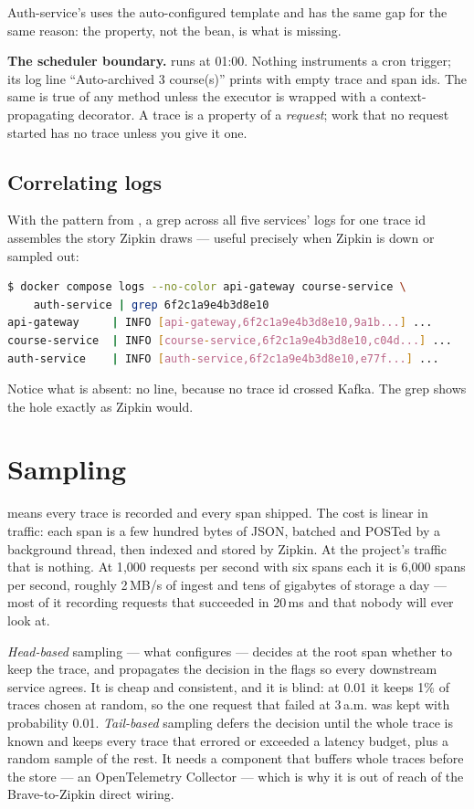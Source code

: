 Auth-service's  uses the auto-configured
template and has the same gap for the same reason: the property, not
the bean, is what is missing.

\textbf{The scheduler boundary.}  runs
 at 01:00. Nothing instruments a cron trigger; its log
line ``Auto-archived 3 course(s)'' prints with empty trace and span ids.
The same is true of any  method unless the executor is
wrapped with a context-propagating decorator. A trace is a property of a
\emph{request}; work that no request started has no trace unless you
give it one.

\subsection{Correlating logs}

With the pattern from , a grep across all five services' logs for
one trace id assembles the story Zipkin draws --- useful precisely when
Zipkin is down or sampled out:

\begin{lstlisting}[language=bash]
$ docker compose logs --no-color api-gateway course-service \
    auth-service | grep 6f2c1a9e4b3d8e10
api-gateway     | INFO [api-gateway,6f2c1a9e4b3d8e10,9a1b...] ...
course-service  | INFO [course-service,6f2c1a9e4b3d8e10,c04d...] ...
auth-service    | INFO [auth-service,6f2c1a9e4b3d8e10,e77f...] ...
\end{lstlisting}

Notice what is absent: no  line, because no
trace id crossed Kafka. The grep shows the hole exactly as Zipkin would.

\section{Sampling}
\label{sec:sampling}

 means every trace is recorded and every span
shipped. The cost is linear in traffic: each span is a few hundred bytes
of JSON, batched and POSTed by a background thread, then indexed and
stored by Zipkin. At the project's traffic that is nothing. At
1{,}000 requests per second with six spans each it is 6{,}000 spans per
second, roughly 2\,MB/s of ingest and tens of gigabytes of storage a
day --- most of it recording requests that succeeded in 20\,ms and
that nobody will ever look at.

\emph{Head-based} sampling --- what  configures ---
decides at the root span whether to keep the trace, and propagates the
decision in the \code{traceparent} flags so every downstream service
agrees. It is cheap and consistent, and it is blind: at 0.01 it keeps
1\% of traces chosen at random, so the one request that failed at
3\,a.m. was kept with probability 0.01. \emph{Tail-based} sampling
defers the decision until the whole trace is known and keeps every
trace that errored or exceeded a latency budget, plus a random sample
of the rest. It needs a component that buffers whole traces before the
store --- an OpenTelemetry Collector --- which is why it is out of
reach of the Brave-to-Zipkin direct wiring.

